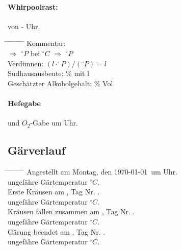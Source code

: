 \documentclass[12pt,oneside,a4paper]{scrartcl}
\begin{document}
\paragraph{Whirpoolrast:} von - Uhr.
	\begin{tabbing}
		\hspace{1cm} \= \hspace{1cm} \= \hspace{1cm} \= \hspace{1cm} \= \hspace{1cm} \= \hspace{1cm} \= \hspace{1cm} \= \hspace{1cm} \= \kill
		\> Kommentar: \> \> \> \\
		\> \> $\Rightarrow$ $^\circ P$ \> \> bei \> $^\circ C$ \> $\Rightarrow$ \> $^\circ P$\\
		\> \> Verdünnen: \> \> \> \> \> $(l \cdot ^\circ P)/(^\circ P)=l$\\
		\> \> Sudhausausbeute: \> \> \> \> \>  \% mit l\\
		\> \> Geschätzter Alkoholgehalt: \> \> \> \> \> \% Vol.
	\end{tabbing}
%
\paragraph{Hefegabe} und $O_2$-Gabe um Uhr.
%
\subsection*{Gärverlauf}
	\begin{tabbing}
		\hspace{1cm} \= \hspace{1cm} \= \hspace{1cm} \= \hspace{1cm} \= \hspace{1cm} \= \hspace{1cm} \= \hspace{1cm} \= \hspace{1cm} \= \kill
		\> Angestellt am Montag, den \today \ um Uhr.\\
		\> \> ungefähre Gärtemperatur $^\circ C$.\\
		\> Erste Kräusen am , Tag Nr. .\\
		\> \> ungefähre Gärtemperatur $^\circ C$.\\
		\> Kräusen fallen zusammen am , Tag Nr. .\\
		\> \> ungefähre Gärtemperatur $^\circ C$.\\
		\> Gärung beendet am , Tag Nr. .\\
		\> \> ungefähre Gärtemperatur $^\circ C$.
	\end{tabbing}
%
\end{document}

